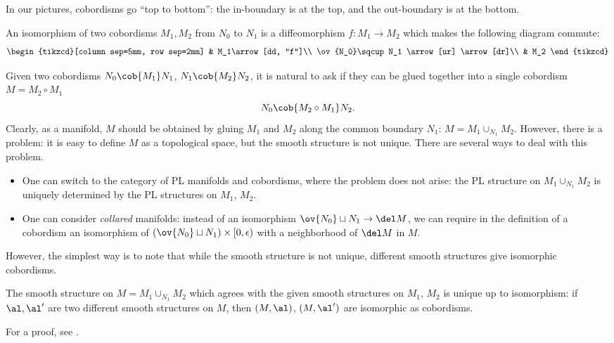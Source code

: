 \begin{convention}\label{conv:cobordism-pictures}
In our pictures, cobordisms go ``top to bottom'':
the in-boundary is at the top, and the out-boundary is at the bottom.
\end{convention}

\begin{definition}\label{d:cobordism-isomorphism}
  An isomorphism of two cobordisms $M_1, M_2$ from $N_0$ to $N_1$ is a
  diffeomorphism $f\colon M_1\to M_2$ which makes the following diagram commute:
  \begin{equation}\label{e:cob-iso}
  \begin{tikzcd}[column sep=5mm, row sep=2mm]
    & M_1\arrow[dd, "f"]\\
    \ov{N_0}\sqcup N_1
    \arrow[ur]
    \arrow[dr]\\
    & M_2
  \end{tikzcd}
  \end{equation}
\end{definition}
Given two cobordisms $N_0\cob{M_1}N_1$, $N_1\cob{M_2}N_2$, it is natural to
ask if they can be glued together into a single cobordism $M=M_2\circ M_1$
$$
  N_0\cob{M_2\circ M_1}N_2.
$$
Clearly, as a manifold, $M$ should be obtained by gluing $M_1$ and $M_2$ along
the common boundary $N_1$: $M= M_1\cup_{N_1} M_2$. However, there is a problem:
it is easy to define $M$ as a topological space, but the smooth structure is not
unique. There are several ways to deal with this problem.
\begin{itemize}
  \item One can switch to the category of PL manifolds and cobordisms,
    where the problem does not arise: the PL structure on $M_1\cup_{N_1} M_2$
    is uniquely determined by the PL structures on $M_1$, $M_2$.
  \item One can consider \emph{collared}
    manifolds: instead of
    an isomorphism $\ov{N_0}\sqcup N_1\to \del M$,
    we can require in the definition of a cobordism an isomorphism of
    $(\ov{N_0}\sqcup N_1)\times [0, \epsilon)$ with a neighborhood
    of $\del M$ in $M$.
\end{itemize}
However, the simplest way is to note that while the smooth structure is not
unique, different smooth structures give isomorphic cobordisms.

\begin{theorem}\label{t:gluing-unique}
  The smooth structure on $M=M_1\cup_{N_1} M_2$ which agrees with
  the given smooth structures on $M_1$, $M_2$ is unique up to isomorphism:
  if $\al, \al'$ are two different smooth structures on $M$, then $(M,\al)$,
  $(M,\al')$ are isomorphic as cobordisms.
\end{theorem}
For a proof, see \cite[Theorem 1.3.12]{kock}.

